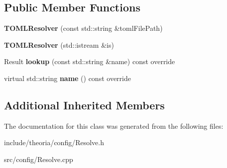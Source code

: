 \subsection*{Public Member Functions}
\begin{DoxyCompactItemize}
\item 
\hypertarget{classtheoria_1_1config_1_1TOMLResolver_a94a2659c23a5c85d05fb62e67c8c7810}{{\bfseries T\+O\+M\+L\+Resolver} (const std\+::string \&toml\+File\+Path)}\label{classtheoria_1_1config_1_1TOMLResolver_a94a2659c23a5c85d05fb62e67c8c7810}

\item 
\hypertarget{classtheoria_1_1config_1_1TOMLResolver_a2772b7d149cabddd2b622b786720420f}{{\bfseries T\+O\+M\+L\+Resolver} (std\+::istream \&is)}\label{classtheoria_1_1config_1_1TOMLResolver_a2772b7d149cabddd2b622b786720420f}

\item 
\hypertarget{classtheoria_1_1config_1_1TOMLResolver_a42daff166eca2c9c9dd77868faf0122d}{Result {\bfseries lookup} (const std\+::string \&name) const override}\label{classtheoria_1_1config_1_1TOMLResolver_a42daff166eca2c9c9dd77868faf0122d}

\item 
\hypertarget{classtheoria_1_1config_1_1TOMLResolver_a6b50ff1e396f74183318915e602837fc}{virtual std\+::string {\bfseries name} () const override}\label{classtheoria_1_1config_1_1TOMLResolver_a6b50ff1e396f74183318915e602837fc}

\end{DoxyCompactItemize}
\subsection*{Additional Inherited Members}


The documentation for this class was generated from the following files\+:\begin{DoxyCompactItemize}
\item 
include/theoria/config/Resolve.\+h\item 
src/config/Resolve.\+cpp\end{DoxyCompactItemize}
